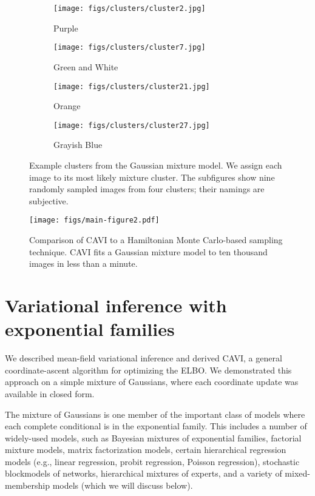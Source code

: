 \documentclass{article}
\begin{document}
\begin{figure}[htb]
\centering
  \begin{subfigure}[b]{1in}
    \centering
    \texttt{[image: figs/clusters/cluster2.jpg]}
    \caption{Purple}
    \label{sub:purple}
  \end{subfigure}
  \hspace*{0.1in}
  \begin{subfigure}[b]{1in}
    \centering
    \texttt{[image: figs/clusters/cluster7.jpg]}
    \caption{Green and White}
    \label{sub:green_and_white}
  \end{subfigure}
  \hspace*{0.1in}
  \begin{subfigure}[b]{1in}
    \centering
    \texttt{[image: figs/clusters/cluster21.jpg]}
    \caption{Orange}
    \label{sub:orange}
  \end{subfigure}
  \hspace*{0.1in}
  \begin{subfigure}[b]{1in}
    \centering
    \texttt{[image: figs/clusters/cluster27.jpg]}
    \caption{Grayish Blue}
    \label{sub:grayish_blue}
  \end{subfigure}
  \caption{Example clusters from the Gaussian mixture model. We
  assign each image to its most likely mixture cluster. The subfigures show nine
  randomly sampled images from four clusters; their namings are subjective.
  }
  \label{fig:clusters}
\end{figure}

\begin{figure}[htb]
  \centering
  \texttt{[image: figs/main-figure2.pdf]}
  \caption{Comparison of \gls{CAVI} to a Hamiltonian Monte Carlo-based sampling
  technique. \gls{CAVI} fits a Gaussian mixture model to ten
  thousand images in less than a minute.}
  \label{fig:image_logpred}
\end{figure}
 \section{Variational inference with exponential families} \label{sec:ef}

We described mean-field variational inference and derived \gls{CAVI},
a general coordinate-ascent algorithm for optimizing the \gls{ELBO}.
We demonstrated this approach on a simple mixture of Gaussians, where
each coordinate update was available in closed form.

The mixture of Gaussians is one member of the important class of
models where each complete conditional is in the exponential family.
This includes a number of widely-used models, such as Bayesian
mixtures of exponential families, factorial mixture models, matrix
factorization models, certain hierarchical regression models (e.g.,
linear regression, probit regression, Poisson regression), stochastic
blockmodels of networks, hierarchical mixtures of experts, and a
variety of mixed-membership models (which we will discuss below).
\end{document}
